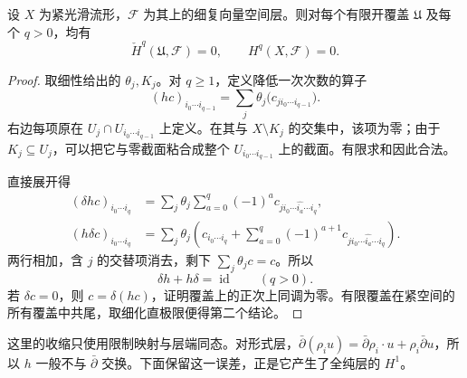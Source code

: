 \begin{proposition}
\label{g4:prop:0302:fine-acyclic}
设 \(X\) 为紧光滑流形，\(\mathcal F\) 为其上的细复向量空间层。则对每个有限开覆盖 \(\mathfrak U\) 及每个 \(q>0\)，均有
\[
 \check H^q(\mathfrak U,\mathcal F)=0,
 \qquad H^q(X,\mathcal F)=0.
\]
\end{proposition}
\begin{proof}
取细性给出的 \(\theta_j,K_j\)。对 \(q\geq1\)，定义降低一次次数的算子
\begin{equation}
\label{g4:eq:0302:fine-homotopy}
 (hc)_{i_0\cdots i_{q-1}}
 =\sum_j\theta_j\bigl(c_{j i_0\cdots i_{q-1}}\bigr).
\end{equation}
右边每项原在 \(U_j\cap U_{i_0\cdots i_{q-1}}\) 上定义。在其与 \(X\setminus K_j\) 的交集中，该项为零；由于 \(K_j\subseteq U_j\)，可以把它与零截面粘合成整个 \(U_{i_0\cdots i_{q-1}}\) 上的截面。有限求和因此合法。

直接展开得
\[
 \begin{aligned}
 (\delta hc)_{i_0\cdots i_q}
 &=\sum_j\theta_j\sum_{a=0}^{q}(-1)^a
      c_{j i_0\cdots\widehat{i_a}\cdots i_q},\\
 (h\delta c)_{i_0\cdots i_q}
 &=\sum_j\theta_j\left(c_{i_0\cdots i_q}
      +\sum_{a=0}^{q}(-1)^{a+1}
       c_{j i_0\cdots\widehat{i_a}\cdots i_q}\right).
 \end{aligned}
\]
两行相加，含 \(j\) 的交替项消去，剩下 \(\sum_j\theta_jc=c\)。所以
\[
 \delta h+h\delta=\operatorname{id}\qquad(q>0).
\]
若 \(\delta c=0\)，则 \(c=\delta(hc)\)，证明覆盖上的正次上同调为零。有限覆盖在紧空间的所有覆盖中共尾，取细化直极限便得第二个结论。
\end{proof}

这里的收缩只使用限制映射与层端同态。对形式层，\(\bar\partial(\rho_i u)=\bar\partial\rho_i\cdot u+\rho_i\bar\partial u\)，所以 \(h\) 一般不与 \(\bar\partial\) 交换。下面保留这一误差，正是它产生了全纯层的 \(H^1\)。

